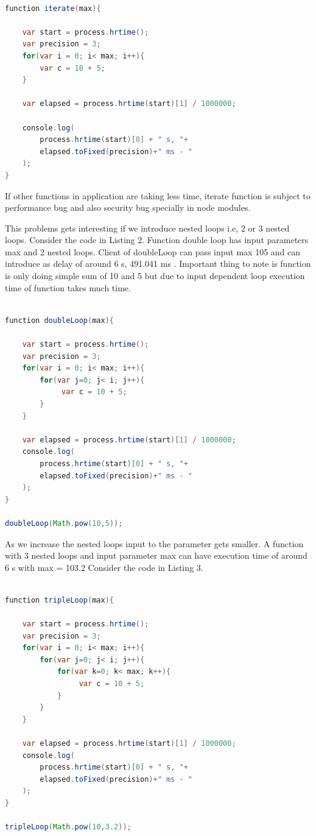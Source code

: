 \documentclass[authoryear,preprint]{sigplanconf}
\begin{document}
\begin{lstlisting}[caption=iterate function with 1 loop,label=l:iterate,language=Java]

function iterate(max){

    var start = process.hrtime();
    var precision = 3;
    for(var i = 0; i< max; i++){
        var c = 10 + 5;
    }

    var elapsed = process.hrtime(start)[1] / 1000000;
    
	console.log(
		process.hrtime(start)[0] + " s, "+
		elapsed.toFixed(precision)+" ms - " 
	);
}

\end{lstlisting}

If other functions in application are taking less time, iterate
function is subject to performance bug and also security bug specially
in node modules.

This problems gets interesting if we introduce nested loops
i.e, 2 or 3 nested loops. Consider the code in Listing 2. Function
double loop has input parameters max and 2 nested loops. Client
of doubleLoop can pass input max 105
and can introduce as delay
of around 6 s, 491.041 ms . Important thing to note is function is
only doing simple sum of 10 and 5 but due to input dependent loop
execution time of function takes much time.

\begin{lstlisting}[caption=doubleLoop function with 2 nested loop,label=l:doubleLoop,language=Java]

function doubleLoop(max){

    var start = process.hrtime();
    var precision = 3;
    for(var i = 0; i< max; i++){
    	for(var j=0; j< i; j++){
			 var c = 10 + 5;
 		}
 	}

    var elapsed = process.hrtime(start)[1] / 1000000;
	console.log(
		process.hrtime(start)[0] + " s, "+
		elapsed.toFixed(precision)+" ms - " 
	);
}

doubleLoop(Math.pow(10,5));

\end{lstlisting}

As we increase the nested loops input to the parameter gets
smaller. A function with 3 nested loops and input parameter max
can have execution time of around 6 s with max = 103.2
Consider the code in Listing 3.

\begin{lstlisting}[caption=tripleLoop function with 2 nested loop,label=l:tripleLoop,language=Java]

function tripleLoop(max){

    var start = process.hrtime();
    var precision = 3;
    for(var i = 0; i< max; i++){
    	for(var j=0; j< i; j++){
    		for(var k=0; k< max; k++){
				 var c = 10 + 5;
 			}
 		}
 	}

    var elapsed = process.hrtime(start)[1] / 1000000;
	console.log(
		process.hrtime(start)[0] + " s, "+
		elapsed.toFixed(precision)+" ms - " 
	);
}

tripleLoop(Math.pow(10,3.2));

\end{lstlisting}
\end{document}
